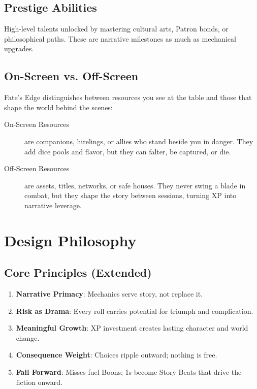 \subsection{Prestige Abilities}\label{subsec:prestige_abilities}

High-level talents unlocked by mastering cultural arts, Patron bonds, or philosophical paths. These are narrative milestones as much as mechanical upgrades.

\subsection{On-Screen vs. Off-Screen}\label{subsec:onscreen_offscreen}

Fate's Edge distinguishes between resources you see at the table and those that shape the world behind the scenes:

\begin{description}
\item[On-Screen Resources] are companions, hirelings, or allies who stand beside you in danger. They add dice pools and flavor, but they can falter, be captured, or die.
\item[Off-Screen Resources] are assets, titles, networks, or safe houses. They never swing a blade in combat, but they shape the story between sessions, turning XP into narrative leverage.
\end{description}

\section{Design Philosophy}\label{sec:design_philosophy}

\subsection{Core Principles (Extended)}\label{subsec:design_core}

\begin{enumerate}
    \item \textbf{Narrative Primacy}: Mechanics serve story, not replace it.
    \item \textbf{Risk as Drama}: Every roll carries potential for triumph and complication.
    \item \textbf{Meaningful Growth}: XP investment creates lasting character and world change.
    \item \textbf{Consequence Weight}: Choices ripple outward; nothing is free.
    \item \textbf{Fail Forward}: Misses fuel Boons; 1s become Story Beats that drive the fiction onward.
\end{enumerate}

